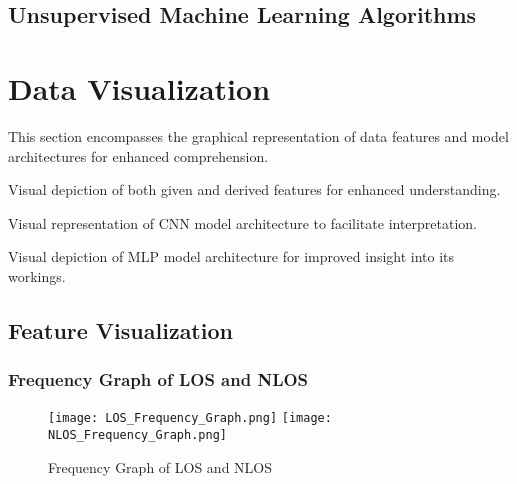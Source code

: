 \documentclass[
	article, %
	11pt, %
	draft, %
]{CSUniSchoolLabReport}
\begin{document}
\subsection{Unsupervised Machine Learning Algorithms}\label{uml}




\section{Data Visualization}\label{data_visualisation}

This section encompasses the graphical representation of data features and model architectures for enhanced comprehension.

\begin{description}[style=nextline]
    \item[Feature Visualization:] Visual depiction of both given and derived features for enhanced understanding.
    \item[Convolution Neural Network:] Visual representation of CNN model architecture to facilitate interpretation.
    \item[Multilayer Perceptron:] Visual depiction of MLP model architecture for improved insight into its workings.
\end{description}

\subsection{Feature Visualization}\label{feature_visualization}

\subsubsection{Frequency Graph of LOS and NLOS}\label{frequency_graph}

\begin{figure}[H] 
	\centering
	\texttt{[image: LOS\_Frequency\_Graph.png]}
	\texttt{[image: NLOS\_Frequency\_Graph.png]}
	\caption{Frequency Graph of LOS and NLOS}\label{fig:frequency_graph}
\end{figure}
\end{document}
